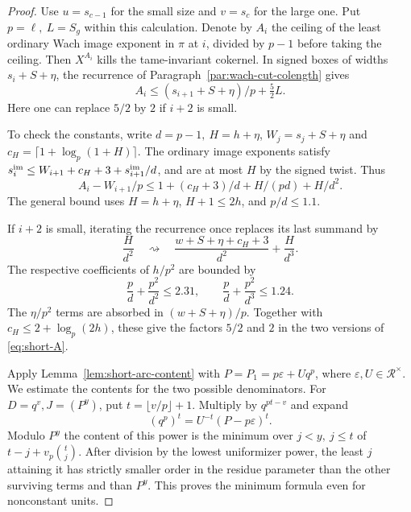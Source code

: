 \begin{proof}
\label{par:short-two-levels}
Use \(u=s_{c-1}\) for the small size and \(v=s_c\) for the large
one. Put \(p=\ell,\ L=S_g\) within this calculation. Denote by
\(A_i\) the ceiling of the least ordinary Wach image exponent in
\(\pi\) at \(i\), divided by \(p-1\) before taking the ceiling.
Then \(X^{A_i}\) kills the tame-invariant cokernel. In signed
boxes of widths \(s_i+S+\eta\), the recurrence of
Paragraph~\ref{par:wach-cut-colength} gives
\begin{equation}\label{eq:short-A}
 A_i\le(s_{i+1}+S+\eta)/p+\tfrac52 L.
\end{equation}
Here one can replace \(5/2\) by \(2\) if \(i+2\) is small.

To check the constants, write \(d=p-1,\ H=h+\eta\),
\(W_j=s_j+S+\eta\) and \(c_H=\lceil1+\log_p(1+H)\rceil\).
The ordinary image exponents satisfy
\(s_i^{\rm im}\le W_{i+1}+c_H+3+s_{i+1}^{\rm im}/d\),
and are at most \(H\) by the signed twist. Thus
\[
 A_i-W_{i+1}/p\le 1+(c_H+3)/d+H/(pd)+H/d^2.
\]
The general bound uses \(H=h+\eta\), \(H+1\le2h\), and
\(p/d\le1.1\).

If \(i+2\) is small, iterating the recurrence
once replaces its last summand by
\[
 \frac{H}{d^2}\quad\rightsquigarrow\quad
 \frac{w+S+\eta+c_H+3}{d^2}+\frac{H}{d^3}.
\]
The respective coefficients of \(h/p^2\) are bounded by
\[
 \frac{p}{d}+\frac{p^2}{d^2}\le2.31,\qquad
 \frac{p}{d}+\frac{p^2}{d^3}\le1.24 .
\]
The \(\eta/p^2\) terms are absorbed in \((w+S+\eta)/p\).
Together with \(c_H\le2+\log_p(2h)\), these give the factors
\(5/2\) and \(2\) in the two versions of \eqref{eq:short-A}.
\label{cor:inert-short-two-1}

Apply Lemma~\ref{lem:short-arc-content} with
\(P=P_1=p\varepsilon+Uq^p\), where \(\varepsilon,U\in\mathcal R^\times\).
We estimate the contents for the two possible denominators.
For \(D=q^v,J=(P^y)\), put \(t=\lfloor v/p\rfloor+1\).
Multiply by \(q^{pt-v}\) and expand
\[
 (q^p)^t=U^{-t}(P-p\varepsilon)^t.
\]
Modulo \(P^y\) the
content of this power is the minimum over \(j<y,\ j\le t\)
of \(t-j+v_p\binom tj\). After division by the lowest
uniformizer power, the least \(j\) attaining it has strictly
smaller order in the residue parameter than the other surviving
terms and than \(P^y\). This proves the minimum formula even for
nonconstant units.


\end{proof}
